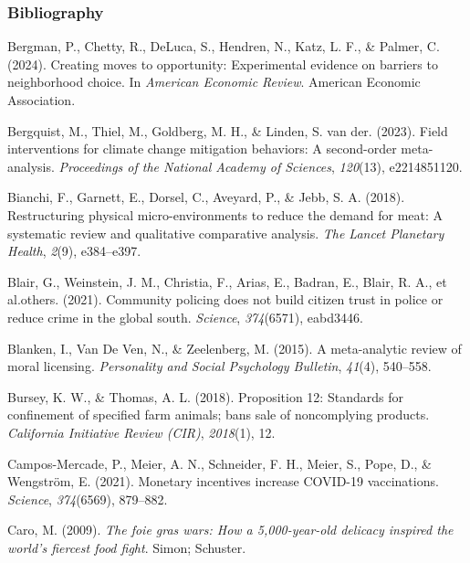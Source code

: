 \documentclass[
  man]{apa6}
\newlength{\cslhangindent}
\newenvironment{CSLReferences}[2] %
 {\begin{list}{}{%
  \setlength{\itemindent}{0pt}
  \setlength{\leftmargin}{0pt}
  \setlength{\parsep}{0pt}
  \ifodd #1
   \setlength{\leftmargin}{\cslhangindent}
   \setlength{\itemindent}{-1\cslhangindent}
  \fi
  \setlength{\itemsep}{#2\baselineskip}}}
 {\end{list}}
\begin{document}
\subsubsection*{Bibliography}\label{bibliography}

\label{refs}
\begin{CSLReferences}{1}{0}
Bergman, P., Chetty, R., DeLuca, S., Hendren, N., Katz, L. F., \& Palmer, C. (2024). Creating moves to opportunity: Experimental evidence on barriers to neighborhood choice. In \emph{American Economic Review}. American Economic Association.

Bergquist, M., Thiel, M., Goldberg, M. H., \& Linden, S. van der. (2023). Field interventions for climate change mitigation behaviors: A second-order meta-analysis. \emph{Proceedings of the National Academy of Sciences}, \emph{120}(13), e2214851120.

Bianchi, F., Garnett, E., Dorsel, C., Aveyard, P., \& Jebb, S. A. (2018). Restructuring physical micro-environments to reduce the demand for meat: A systematic review and qualitative comparative analysis. \emph{The Lancet Planetary Health}, \emph{2}(9), e384--e397.

Blair, G., Weinstein, J. M., Christia, F., Arias, E., Badran, E., Blair, R. A., et al.others. (2021). Community policing does not build citizen trust in police or reduce crime in the global south. \emph{Science}, \emph{374}(6571), eabd3446.

Blanken, I., Van De Ven, N., \& Zeelenberg, M. (2015). A meta-analytic review of moral licensing. \emph{Personality and Social Psychology Bulletin}, \emph{41}(4), 540--558.

Bursey, K. W., \& Thomas, A. L. (2018). Proposition 12: Standards for confinement of specified farm animals; bans sale of noncomplying products. \emph{California Initiative Review (CIR)}, \emph{2018}(1), 12.

Campos-Mercade, P., Meier, A. N., Schneider, F. H., Meier, S., Pope, D., \& Wengström, E. (2021). Monetary incentives increase COVID-19 vaccinations. \emph{Science}, \emph{374}(6569), 879--882.

Caro, M. (2009). \emph{The foie gras wars: How a 5,000-year-old delicacy inspired the world's fiercest food fight}. Simon; Schuster.


\end{CSLReferences}
\end{document}
